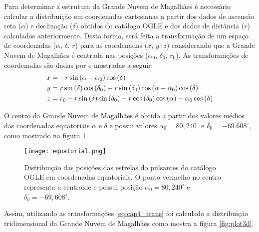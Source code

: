 Para determinar a estrutura da Grande Nuvem de Magalhães é necessário calcular a distribuição em coordenadas cartesianas a partir dos dados de ascensão reta ($\alpha$) e declinação ($\delta$) obtidos do catálogo OGLE e dos dados de distância ($r$) calculados anteriormente. Desta forma, será feita a transformação de um espaço de coordenadas ($\alpha$, $\delta$, $r$) para as coordenadas ($x$, $y$, $z$) considerando que a Grande Nuvem de Magalhães é centrada nas posições ($\alpha_0$, $\delta_0$, $r_0$). As transformações de coordenadas são dadas por \citet{Deb2014} e mostradas a seguir:
\begin{align}
x &= -r \sin \left(\alpha - \alpha_0 \right) \cos \left( \delta \right) \notag \\
y &= r \sin \left( \delta \right) \cos \left( \delta_0 \right) - r \sin \left( \delta_0 \right) \cos \left( \alpha - \alpha_0 \right) \cos \left( \delta \right) \label{eq:cap4_trans}\\
z &= r_0 - r \sin \left( \delta \right) \sin \left(\delta_0 \right) - r \cos \left( \delta_0 \right) \cos \left( \alpha \right) - \alpha_0 \cos \left( \delta \right) \notag
\end{align}


O centro da Grande Nuvem de Magalhães é obtido a partir dos valores médios das coordenadas equatoriais $\alpha$ e $\delta$ e possui valores $\alpha_0 = 80,240^\circ$ e $\delta_0 = -69.608^\circ$, como mostrado na figura \ref{fig:equatorial}.

\begin{figure}[!ht]
\centering
\texttt{[image: equatorial.png]}
\caption[Distruibuição de estrelas em coordenadas equatoriais.]{Distribuição das posições das estrelas do pulsantes do catálogo OGLE em coordenadas equatoriais. O ponto vermelho no centro representa a centroide e possui posição $\alpha_0 = 80,240^\circ$ e $\delta_0 = -69,608^\circ$.}
\label{fig:equatorial}
\end{figure}

Assim, utilizando as transformações \ref{eq:cap4_trans} foi calculado a distribuição tridimensional da Grande Nuvem de Magalhães como mostra a figura \ref{fig:plot3d}.

